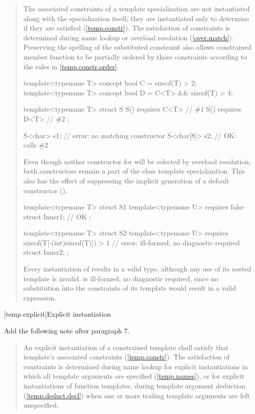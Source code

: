 \begin{quote}
\begin{addedblock}
\setcounter{Paras}{15}
\pnum
The associated constraints of a template specialization are not
instantiated along with the specialization itself; they are
instantiated only to determine if they are satisfied
(\ref{temp.constr}).
% 
\enternote
The satisfaction of constraints is determined during name lookup or overload
resolution (\ref{over.match}). Preserving the spelling
of the substituted constraint also allows constrained member function
to be partially ordered by those constraints according to the rules
in \ref{temp.constr.order}.
\exitnote
% 
\enterexample
\begin{codeblock}
template<typename T> concept bool C = sizeof(T) > 2;
template<typename T> concept bool D = C<T> && sizeof(T) > 4;

template<typename T> struct S {
  S() requires C<T> { } // \#1
  S() requires D<T> { } // \#2
};

S<char> s1;    // error: no matching constructor
S<char[8]> s2; // OK: calls \#2
\end{codeblock}

Even though neither constructor for  will be selected by
overload resolution, both constructors remain a part of the class template 
specialization. 
% 
This also has the effect of suppressing the implicit generation of a default
constructor ().
\exitexample
% 
\enterexample
\begin{codeblock}
template<typename T> struct S1 {
  template<typename U> requires false struct Inner1; // OK
};

template<typename T> struct S2 {
  template<typename U> 
    requires sizeof(T[-(int)sizeof(T)]) > 1 // error: ill-formed, no diagnostic required
      struct Inner2;
};
\end{codeblock}
\exitexample
Every instantiation of  results in a valid type, although any use 
of its nested  template is invalid.
% 
 is ill-formed, no diagnostic required, since no substitution into 
the constraints of its  template would result in a valid 
expression.
\end{addedblock}
\end{quote}


[temp.explicit]{Explicit instantiation}

Add the following note after paragraph 7.

\begin{quote}
\setcounter{Paras}{7}
\begin{addedblock}
\pnum
\enternote
An explicit instantiation of a constrained template shall satisfy that
template's associated constraints (\ref{temp.constr}). The satisfaction
of constraints is determined during name lookup for explicit instantiations
in which all template arguments are specified (\ref{temp.names}), or for
explicit instantiations of function templates, during template argument 
deduction (\ref{temp.deduct.decl}) when one or more trailing template 
arguments are left unspecified.
\exitnote
\end{addedblock}
\end{quote}

